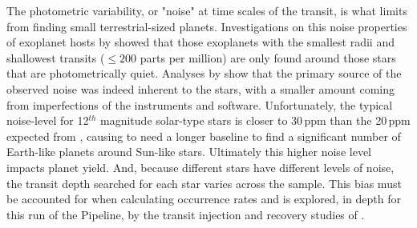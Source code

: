 {\color{blue}
The photometric variability, or "noise" at time scales of the transit, is what limits \Kepler{} from finding small terrestrial-sized planets. Investigations on this noise properties of \Kepler{} exoplanet hosts by \citet{Howell2016} showed that those exoplanets with the smallest radii and shallowest transits ($\leq 200$ parts per million) are only found around those stars that are photometrically quiet.  Analyses by \citet{Gilliland2015,Gilliland2011} show that the primary source of the observed noise was indeed inherent to the stars, with a smaller amount coming from imperfections of the instruments and software. Unfortunately, the typical noise-level for 12$^{th}$ magnitude solar-type stars is closer to 30\,ppm \citep{Gilliland2015} than the 20\,ppm expected from \citet{Jenkins2002a}, causing \Kepler{} to need a longer baseline to find a significant number of Earth-like planets around Sun-like stars.   Ultimately this higher noise level impacts  planet yield. And, because different stars have different levels of noise, the transit depth searched for each star varies across the sample. This bias must be accounted for when calculating occurrence rates and is explored, in depth for this run of the \Kepler{} Pipeline, by the transit injection and recovery studies of \citet[][]{Burke2017a,Burke2017b,Christiansen2017}.




}


